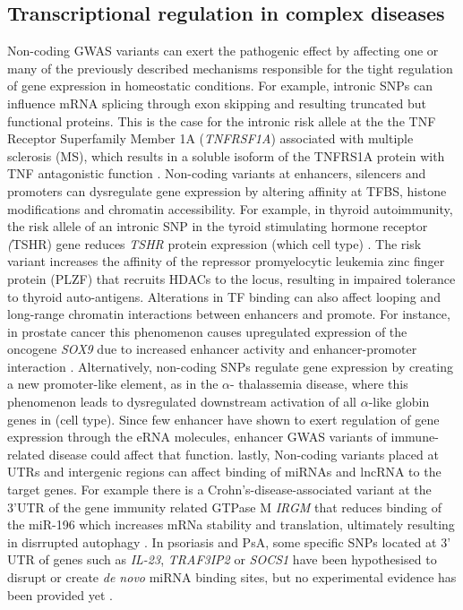 \subsection{Transcriptional regulation in complex diseases}
Non-coding GWAS variants can exert the pathogenic effect by affecting one or many of the previously described mechanisms responsible for the tight regulation of gene expression in homeostatic conditions. For example, intronic SNPs can influence mRNA splicing through exon skipping and resulting truncated but functional proteins. This is the case for the intronic risk allele at the the TNF Receptor Superfamily Member 1A (\textit{TNFRSF1A}) associated with multiple sclerosis (MS), which results in a soluble isoform of the TNFRS1A protein with TNF antagonistic function \parencite{Gregory2012}. Non-coding variants at enhancers, silencers and promoters can dysregulate gene expression by altering affinity at TFBS, histone modifications and chromatin accessibility. For example, in thyroid autoimmunity, the risk allele of an intronic SNP in the tyroid stimulating hormone receptor \textit(TSHR) gene reduces \textit{TSHR} protein expression (which cell type) \parencite{Stefan2014}. The risk variant increases the affinity of the repressor promyelocytic leukemia zinc finger protein (PLZF) that recruits HDACs to the locus, resulting in impaired tolerance to thyroid auto-antigens. Alterations in TF binding can also affect looping and long-range chromatin interactions between enhancers and promote. For instance, in prostate cancer this phenomenon causes upregulated expression of the oncogene \textit{SOX9} due to increased enhancer activity and enhancer-promoter interaction \parencite{Zhang2012}. 
Alternatively, non-coding SNPs regulate gene expression by creating a new promoter-like element, as in the $\alpha$- thalassemia disease, where this phenomenon leads to dysregulated downstream activation of all $\alpha$-like globin genes in (cell type)\parencite{Gobbi2006}. Since few enhancer have shown to exert regulation of gene expression through the eRNA molecules, enhancer GWAS variants of immune-related disease could affect that function\parencite{Shechner2015,Fahr2014}. lastly, Non-coding variants placed at UTRs and intergenic regions can affect binding of miRNAs and lncRNA to the target genes. For example  there is a Crohn’s-disease-associated variant at the 3'UTR of the gene immunity related GTPase M \textit{IRGM} that reduces binding of the miR-196 which increases mRNa stability and translation, ultimately resulting in disrrupted autophagy  \parencite{Brest2011}. In psoriasis and PsA, some specific SNPs located at 3' UTR of genes such as \textit{IL-23}, \textit{TRAF3IP2} or \textit{SOCS1} have been hypothesised to disrupt or create \textit{de novo} miRNA binding sites, but no experimental evidence has been provided yet \parencite{Pivarcsi2014}. 



